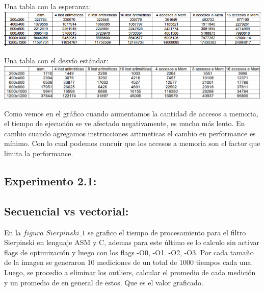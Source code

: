 \documentclass[a4paper]{article}
\begin{document}
Una tabla con la esperanza: \newline
\includegraphics[width=\textwidth,height=\textheight,keepaspectratio
]{tablaMenVsArit.png}
\begin {flushleft}
\end{flushleft}

Una tabla con el desvío estándar:\newline
\includegraphics[width=\textwidth,height=\textheight,keepaspectratio
]{tablaVarianzaMenvscpu.png}
\begin {flushleft}
\end{flushleft}
Como vemos en el gráfico cuando aumentamos la cantidad de accesos a memoria, el tiempo de ejecución se ve afectado negativamente, es mucho más lento.
En cambio cuando agregamos instrucciones aritmeticas el cambio en performance es mínimo.
Con lo cual podemos concuir que los accesos a memoria son el factor que limita la performance.



\subsection{Experimento 2.1:}

\subsection{Secuencial vs vectorial:}

En la $figura$ $Sierpinski\_1$ se grafico el tiempo de procesamiento para el filtro Sierpinski en lenguaje ASM y C, ademas para este último se lo calculo  sin activar flags de optimización y luego con los flags -O0, -O1. -O2, -O3. Por cada tamaño de la imagen se generaron 10 mediciones de un total de 1000 tiempos cada una. Luego, se procedio a eliminar los outliers, calcular el promedio de cada medición y un promedio de en general de estos. Que es el valor graficado. 
\end{document}
